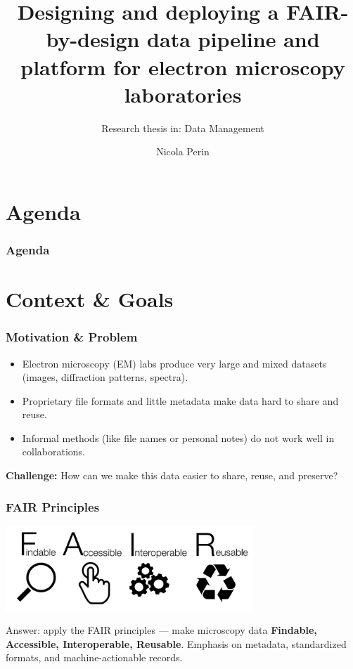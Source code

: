 \documentclass{beamer}
\title[FAIR-by-design EM pipeline]{Designing and deploying a FAIR-by-design data pipeline and platform for electron microscopy laboratories}
\subtitle{Research thesis in: Data Management}
\institute{University of Trieste}
\author[Nicola Perin]{Nicola Perin}
\begin{document}
	
	
	\begin{frame}
		\setTitlestyleDissertation
		\maketitle
	\end{frame}
	
	\section*{Agenda}
	\begin{frame}
		\frametitle{Agenda}
		\tableofcontents
	\end{frame}
	
	\section{Context \& Goals}
	
	\begin{frame}
		\frametitle{Motivation \& Problem}
		\begin{itemize}
			\item Electron microscopy (EM) labs produce very large and mixed datasets (images, diffraction patterns, spectra).
			\item Proprietary file formats and little metadata make data hard to share and reuse.
			\item Informal methods (like file names or personal notes) do not work well in collaborations.
		\end{itemize}
		\vspace{1em}
		\textbf{Challenge:} How can we make this data easier to share, reuse, and preserve?
	\end{frame}
	
	\begin{frame}
		\frametitle{FAIR Principles}
		\centering
		\includegraphics[width=0.7\textwidth]{otherResources/FAIR_data_principles.png}
		
		\vspace{1em}
		\small
		Answer: apply the FAIR principles — make microscopy data  
		\textbf{Findable, Accessible, Interoperable, Reusable}.  
		Emphasis on metadata, standardized formats, and machine-actionable records.
	\end{frame}
\end{document}
